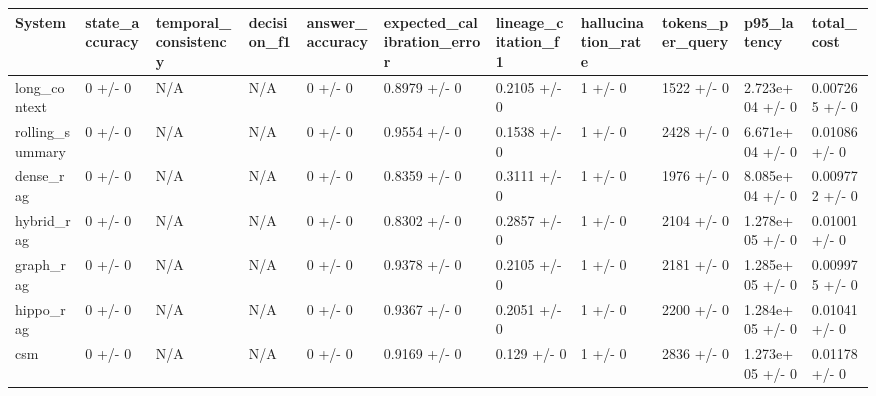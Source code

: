 \begin{tabular}{lllllllllll}
System & state_accuracy & temporal_consistency & decision_f1 & answer_accuracy & expected_calibration_error & lineage_citation_f1 & hallucination_rate & tokens_per_query & p95_latency & total_cost \\
\hline
long\_context & 0 +/- 0 & N/A & N/A & 0 +/- 0 & 0.8979 +/- 0 & 0.2105 +/- 0 & 1 +/- 0 & 1522 +/- 0 & 2.723e+04 +/- 0 & 0.007265 +/- 0 \\
rolling\_summary & 0 +/- 0 & N/A & N/A & 0 +/- 0 & 0.9554 +/- 0 & 0.1538 +/- 0 & 1 +/- 0 & 2428 +/- 0 & 6.671e+04 +/- 0 & 0.01086 +/- 0 \\
dense\_rag & 0 +/- 0 & N/A & N/A & 0 +/- 0 & 0.8359 +/- 0 & 0.3111 +/- 0 & 1 +/- 0 & 1976 +/- 0 & 8.085e+04 +/- 0 & 0.009772 +/- 0 \\
hybrid\_rag & 0 +/- 0 & N/A & N/A & 0 +/- 0 & 0.8302 +/- 0 & 0.2857 +/- 0 & 1 +/- 0 & 2104 +/- 0 & 1.278e+05 +/- 0 & 0.01001 +/- 0 \\
graph\_rag & 0 +/- 0 & N/A & N/A & 0 +/- 0 & 0.9378 +/- 0 & 0.2105 +/- 0 & 1 +/- 0 & 2181 +/- 0 & 1.285e+05 +/- 0 & 0.009975 +/- 0 \\
hippo\_rag & 0 +/- 0 & N/A & N/A & 0 +/- 0 & 0.9367 +/- 0 & 0.2051 +/- 0 & 1 +/- 0 & 2200 +/- 0 & 1.284e+05 +/- 0 & 0.01041 +/- 0 \\
csm & 0 +/- 0 & N/A & N/A & 0 +/- 0 & 0.9169 +/- 0 & 0.129 +/- 0 & 1 +/- 0 & 2836 +/- 0 & 1.273e+05 +/- 0 & 0.01178 +/- 0 \\
\end{tabular}
